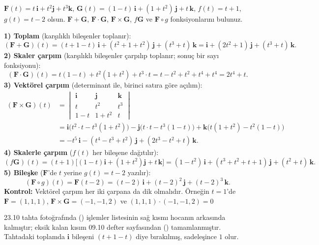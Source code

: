 \begin{soru}
$\mathbf F(t)=t\,\mathbf i+t^2\mathbf j+t^3\mathbf k$, $\mathbf G(t)=(1-t)\,\mathbf i+(1+t^2)\,\mathbf j+t\,\mathbf k$,
$f(t)=t+1$, $g(t)=t-2$ olsun. $\mathbf F+\mathbf G$, $\mathbf F\cdot\mathbf G$, $\mathbf F\times\mathbf G$, $f\mathbf G$
ve $\mathbf F\circ g$ fonksiyonlarını bulunuz.
\end{soru}
\begin{cevap}
\textbf{1) Toplam} (karşılıklı bileşenler toplanır):
\[ (\mathbf F+\mathbf G)(t)=(t+1-t)\,\mathbf i+(t^2+1+t^2)\,\mathbf j+(t^3+t)\,\mathbf k=\mathbf i+(2t^2+1)\,\mathbf j+(t^3+t)\,\mathbf k . \]
\textbf{2) Skaler çarpım} (karşılıklı bileşenler çarpılıp toplanır; sonuç bir sayı fonksiyonu):
\[ (\mathbf F\cdot\mathbf G)(t)=t(1-t)+t^2(1+t^2)+t^3\cdot t=t-t^2+t^2+t^4+t^4=2t^4+t . \]
\textbf{3) Vektörel çarpım} (determinant ile, birinci satıra göre açılım):
\begin{align*}
(\mathbf F\times\mathbf G)(t)&=\begin{vmatrix}\mathbf i&\mathbf j&\mathbf k\\ t&t^2&t^3\\ 1-t&1+t^2&t\end{vmatrix}\\
&=\mathbf i\big(t^2\cdot t-t^3(1+t^2)\big)-\mathbf j\big(t\cdot t-t^3(1-t)\big)+\mathbf k\big(t(1+t^2)-t^2(1-t)\big)\\
&=-t^5\,\mathbf i-(t^4-t^3+t^2)\,\mathbf j+(2t^3-t^2+t)\,\mathbf k .
\end{align*}
\textbf{4) Skalerle çarpım} ($f(t)$ her bileşene dağıtılır):
\[ (f\mathbf G)(t)=(t+1)\big[(1-t)\mathbf i+(1+t^2)\mathbf j+t\,\mathbf k\big]=(1-t^2)\,\mathbf i+(t^3+t^2+t+1)\,\mathbf j+(t^2+t)\,\mathbf k . \]
\textbf{5) Bileşke} ($\mathbf F$'de $t$ yerine $g(t)=t-2$ yazılır):
\[ (\mathbf F\circ g)(t)=\mathbf F(t-2)=(t-2)\,\mathbf i+(t-2)^2\,\mathbf j+(t-2)^3\,\mathbf k . \]
\textbf{Kontrol:} Vektörel çarpım her iki çarpana da dik olmalıdır. Örneğin $t=1$'de $\mathbf F=(1,1,1)$,
$\mathbf F\times\mathbf G=(-1,-1,2)$ ve $(1,1,1)\cdot(-1,-1,2)=0$ \checkmark
\end{cevap}

\begin{bilgi}[Not]
23.10 tahta fotoğrafında () işlemler listesinin sağ kısmı hocanın arkasında kalmıştır;
eksik kalan kısım 09.10 defter sayfasından () tamamlanmıştır. Tahtadaki toplamda $\mathbf i$
bileşeni $(t+1-t)$ diye bırakılmış, sadeleşince $1$ olur.
\end{bilgi}

